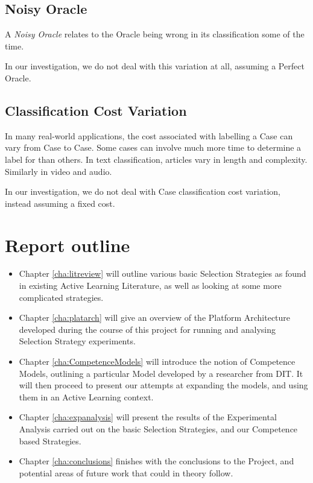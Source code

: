 \documentclass[a4paper,11pt]{report}
\begin{document}
\subsection{Noisy Oracle}
A \emph{Noisy Oracle} relates to the Oracle being wrong in its classification some of the time.

In our investigation, we do not deal with this variation at all, assuming a Perfect Oracle.

\subsection{Classification Cost Variation}
In many real-world applications, the cost associated with labelling a Case can vary from Case to Case. Some cases can involve much more time to determine a label for than others. In text classification, articles vary in length and complexity. Similarly in video and audio.

In our investigation, we do not deal with Case classification cost variation, instead assuming a fixed cost.

\section{Report outline}
\begin{itemize}
	\item Chapter \ref{cha:litreview} will outline various basic Selection Strategies as found in existing Active Learning Literature, as well as looking at some more complicated strategies.
	\item Chapter \ref{cha:platarch} will give an overview of the Platform Architecture developed during the course of this project for running and analysing Selection Strategy experiments.
	\item Chapter \ref{cha:CompetenceModels} will introduce the notion of Competence Models, outlining a particular Model developed by a researcher from DIT. It will then proceed to present our attempts at expanding the models, and using them in an Active Learning context.
	\item Chapter \ref{cha:expanalysis} will present the results of the Experimental Analysis carried out on the basic Selection Strategies, and our Competence based Strategies.
	\item Chapter \ref{cha:conclusions} finishes with the conclusions to the Project, and potential areas of future work that could in theory follow.
\end{itemize}
\end{document}
